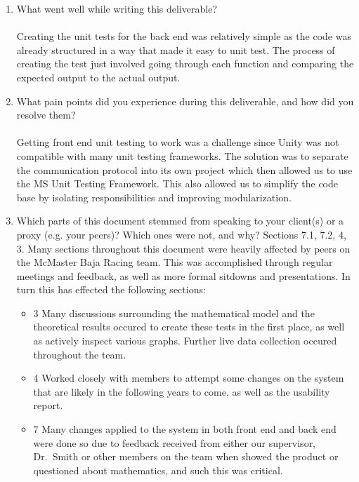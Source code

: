 \documentclass[12pt, titlepage]{article}
\begin{document}


\begin{enumerate}
  \item What went well while writing this deliverable?
  \\
  \\
  Creating the unit tests for the back end was relatively simple as the code was already structured in a way that made it easy to unit test.
  The process of creating the test just involved going through each function and comparing the expected output to the actual output.
  \item What pain points did you experience during this deliverable, and how
    did you resolve them?
  \\
  \\
  Getting front end unit testing to work was a challenge since Unity was not compatible with many unit testing frameworks.
  The solution was to separate the communication protocol into its own project which then allowed us to use the MS Unit Testing Framework.
  This also allowed us to simplify the code base by isolating responsibilities and improving modularization.
  \item Which parts of this document stemmed from speaking to your client(s) or
  a proxy (e.g. your peers)? Which ones were not, and why?
  Sections 7.1, 7.2, 4, 3. Many sections throughout this document were heavily affected by peers on the McMaster Baja Racing team. This was accomplished through regular meetings and feedback, as well as more formal sitdowns and presentations. In turn this has effected the following sections:
  \begin{itemize}
  \item{3} Many discussions surrounding the mathematical model and the theoretical results occured to create these tests in the first place, as well as actively inspect various graphs. Further live data collection occured throughout the team.
  \item{4} Worked closely with members to attempt some changes on the system that are likely in the following years to come, as well as the usability report.
  \item{7} Many changes applied to the system in both front end and back end were done so due to feedback received from either our supervisor, Dr.~Smith or other members on the team when showed the product or questioned about mathematics, and such this was critical.
  \end{itemize}


\end{enumerate}
\end{document}
